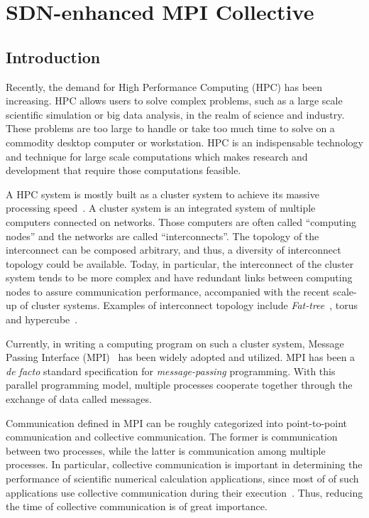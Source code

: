 \chapter{SDN-enhanced MPI Collective}

\section{Introduction}\label{iii-introduction}

Recently, the demand for High Performance Computing (HPC) has been
increasing. HPC allows users to solve complex problems, such as a large
scale scientific simulation or big data analysis, in the realm of
science and industry. These problems are too large to handle or take too
much time to solve on a commodity desktop computer or workstation. HPC
is an indispensable technology and technique for large scale
computations which makes research and development that require those
computations feasible.

A HPC system is mostly built as a cluster system to achieve its massive
processing speed~\autocite{top500}. A cluster system is an integrated system
of multiple computers connected on networks. Those computers are often
called ``computing nodes'' and the networks are called
``interconnects''. The topology of the interconnect can be composed
arbitrary, and thus, a diversity of interconnect topology could be
available. Today, in particular, the interconnect of the cluster system
tends to be more complex and have redundant links between computing
nodes to assure communication performance, accompanied with the recent
scale-up of cluster systems. Examples of interconnect topology include
\emph{Fat-tree}~\autocite{Leiserson1985}, torus~\autocite{Adiga2005} and
hypercube~\autocite{Dally2003}.

Currently, in writing a computing program on such a cluster system, Message
Passing Interface (MPI)~\autocite{Gropp1999,MessagePassingInterfaceForum2012} has
been widely adopted and utilized. MPI has been a \emph{de facto} standard
specification for \emph{message-passing} programming. With this parallel
programming model, multiple processes cooperate together through the exchange
of data called messages.

Communication defined in MPI can be roughly categorized into
point-to-point communication and collective communication. The former is
communication between two processes, while the latter is communication
among multiple processes. In particular, collective communication is
important in determining the performance of scientific numerical
calculation applications, since most of of such applications use
collective communication during their execution~\autocite{Rabenseifner2000}.
Thus, reducing the time of collective communication is of great
importance.

